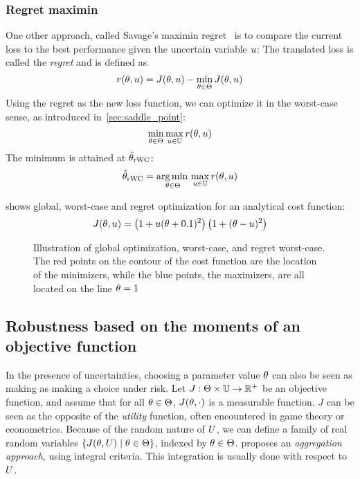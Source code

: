 \documentclass[../../Main_ManuscritThese.tex]{subfiles}
\newcommand\imgpath{/home/victor/acadwriting/Manuscrit/Text/Chapter3/img/}
\begin{document}
\subsubsection{Regret maximin}
\label{ssec:regret_savage}
One other approach, called Savage's maximin regret~\cite{savage_theory_1951} is to compare the current loss to the best performance given the uncertain variable $u$:
The translated loss is called the \emph{regret} and is defined as
\begin{equation}
  r(\theta, u) = J(\theta, u) - \min_{\theta \in \Theta} J(\theta, u)
\end{equation}
Using the regret as the new loss function, we can optimize it in the worst-case sense, as introduced in~\cref{sec:saddle_point}:
\begin{equation}
  \min_{\theta \in \Theta} \max_{u \in \mathbb{U}} r(\theta,u)
\end{equation}
The minimum is attained at $\hat{\theta}_{\mathrm{rWC}}$:
\begin{equation}
  \hat{\theta}_{\mathrm{rWC}} = \operatorname*{arg\,min \,}_{\theta\in\Theta} \max_{u \in \mathbb{U}} r(\theta, u)
\end{equation}

 shows global, worst-case and regret optimization for an analytical cost function:
\begin{equation}
  \label{eq:decision_under_unc}
  J(\theta, u) = \left(1 + u(\theta + 0.1)^2\right)\left(1 + (\theta - u)^2\right)
\end{equation}


\begin{figure}[ht]
  \centering
  
  \caption{\label{fig:decision_under_uncertainty} Illustration of global optimization, worst-case, and regret worst-case. The red points on the contour of the cost function are the location of the minimizers, while the blue points, the maximizers, are all located on the line $\theta = 1$}
\end{figure}

\subsection{Robustness based on the moments of an objective function}
In the presence of uncertainties, choosing a parameter value $\theta$ can also be seen as making as making a choice under risk. Let $J:\Theta \times \mathbb{U}\rightarrow \mathbb{R}^+$ be an objective function, and assume that for all $\theta \in \Theta$, $J(\theta, \cdot)$ is a measurable function.
$J$ can be seen as the opposite of the \emph{utility} function, often encountered in game theory or econometrics.
Because of the random nature of $U$, we can define a family of real random variables $\{J(\theta,U) \mid \theta \in \Theta\}$, indexed by $\theta \in \Theta$. \cite{beyer_robust_2007} proposes an \emph{aggregation approach}, using integral criteria. This integration is usually done with respect to $U$.
\end{document}
